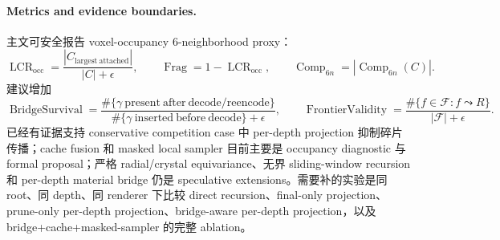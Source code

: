 \paragraph{Metrics and evidence boundaries.}
主文可安全报告 voxel-occupancy 6-neighborhood proxy：
\begin{equation}
\operatorname{LCR}_{\mathrm{occ}}
=\frac{|C_{\mathrm{largest\ attached}}|}{|C|+\epsilon},\qquad
\operatorname{Frag}=1-\operatorname{LCR}_{\mathrm{occ}},\qquad
\operatorname{Comp}_{6n}=|\operatorname{Comp}_{6n}(C)|.
\end{equation}
建议增加
\begin{equation}
\operatorname{BridgeSurvival}
=
\frac{\#\{\gamma\ \mathrm{present\ after\ decode/reencode}\}}
{\#\{\gamma\ \mathrm{inserted\ before\ decode}\}+\epsilon},
\qquad
\operatorname{FrontierValidity}
=
\frac{\#\{f\in\mathcal F:f\leadsto R\}}{|\mathcal F|+\epsilon}.
\end{equation}
已经有证据支持 conservative competition case 中 per-depth projection 抑制碎片传播；cache fusion 和 masked local sampler 目前主要是 occupancy diagnostic 与 formal proposal；严格 radial/crystal equivariance、无界 sliding-window recursion 和 per-depth material bridge 仍是 speculative extensions。需要补的实验是同 root、同 depth、同 renderer 下比较 direct recursion、final-only projection、prune-only per-depth projection、bridge-aware per-depth projection，以及 bridge+cache+masked-sampler 的完整 ablation。
